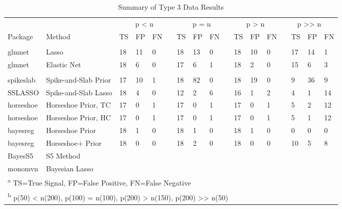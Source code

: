 \documentclass[
  11pt,
]{article}
\begin{document}
\begin{table}[!h]

\caption{\label{tab:Results T3}Summary of Type 3 Data Results}
\centering
\fontsize{8.5}{10.5}\selectfont
\begin{tabular}[t]{>{}l|>{}l|>{}l|>{}l|>{}l|>{}l|>{}l|>{}l|>{}l|>{}l|>{}l|>{}l|>{}l|>{}l|>{}l|>{}l|>{}l|}
\toprule
\multicolumn{2}{c}{ } & \multicolumn{4}{c}{p < n} & \multicolumn{4}{c}{p = n} & \multicolumn{3}{c}{p > n} & \multicolumn{4}{c}{p >> n} \\
\cmidrule(l{3pt}r{3pt}){3-6} \cmidrule(l{3pt}r{3pt}){7-10} \cmidrule(l{3pt}r{3pt}){11-13} \cmidrule(l{3pt}r{3pt}){14-17}
Package & Method & TS & FP & FN &  & TS & FP & FN &  & TS & FP & FN &  & TS & FP & FN\\
\midrule
\addlinespace[0.3em]
\multicolumn{17}{l}{\textbf{Frequentist Methods}}\\
\hspace{1em}glmnet & Lasso & 18 & 11 & 0 &  & 18 & 13 & 0 &  & 18 & 10 & 0 &  & 17 & 14 & 1\\
\hspace{1em}glmnet & Elastic Net & 18 & 6 & 0 &  & 17 & 6 & 1 &  & 18 & 2 & 0 &  & 15 & 6 & 3\\
\addlinespace[0.3em]
\multicolumn{17}{l}{\textbf{Bayesian Methods}}\\
\hspace{1em}spikeslab & Spike-and-Slab Prior & 17 & 10 & 1 &  & 18 & 82 & 0 &  & 18 & 19 & 0 &  & 9 & 36 & 9\\
\hspace{1em}SSLASSO & Spike-and-Slab Lasso & 18 & 4 & 0 &  & 12 & 2 & 6 &  & 16 & 1 & 2 &  & 4 & 1 & 14\\
\hspace{1em}horseshoe & Horseshoe Prior, TC & 17 & 0 & 1 &  & 17 & 0 & 1 &  & 17 & 0 & 1 &  & 5 & 2 & 12\\
\hspace{1em}horseshoe & Horseshoe Prior, HC & 17 & 0 & 1 &  & 17 & 0 & 1 &  & 17 & 0 & 1 &  & 5 & 1 & 12\\
\hspace{1em}bayesreg & Horseshoe Prior & 18 & 1 & 0 &  & 18 & 1 & 0 &  & 18 & 1 & 0 &  & 0 & 0 & 0\\
\hspace{1em}bayesreg & Horseshoe+ Prior & 18 & 0 & 0 &  & 18 & 2 & 0 &  & 18 & 0 & 0 &  & 10 & 5 & 8\\
\hspace{1em}BayesS5 & S5 Method &  &  &  &  &  &  &  &  &  &  &  &  &  &  & \\
\hspace{1em}monomvn & Bayesian Lasso &  &  &  &  &  &  &  &  &  &  &  &  &  &  & \\
\bottomrule
\multicolumn{17}{l}{\textsuperscript{a} TS=True Signal, FP=False Positive, FN=False Negative}\\
\multicolumn{17}{l}{\textsuperscript{b} p(50) < n(200), p(100) = n(100), p(200) > n(150), p(200) >> n(50)}\\
\end{tabular}
\end{table}
\end{document}
